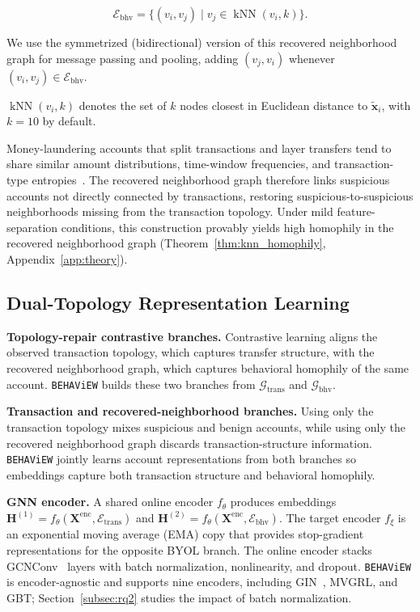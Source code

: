 \documentclass[sigconf,natbib=true,anonymous=true]{acmart}
\theoremstyle{definition}
\newcommand{\method}{\texttt{BEHAViEW}\xspace}
\begin{document}
\begin{equation}
\label{eq:knn_edge}
    \mathcal{E}_{\text{bhv}} = \{(v_i, v_j) \mid v_j \in \operatorname{kNN}(v_i, k)\}.
\end{equation}

We use the symmetrized (bidirectional) version of this recovered neighborhood graph for message passing and pooling, adding $(v_j, v_i)$ whenever $(v_i, v_j) \in \mathcal{E}_{\text{bhv}}$.

$\operatorname{kNN}(v_i, k)$ denotes the set of $k$ nodes closest in Euclidean distance to $\tilde{\mathbf{x}}_i$, with $k=10$ by default.

Money-laundering accounts that split transactions and layer transfers tend to share similar amount distributions, time-window frequencies, and transaction-type entropies~\cite{fatf2018pml,li2020flowscope}. The recovered neighborhood graph therefore links suspicious accounts not directly connected by transactions, restoring suspicious-to-suspicious neighborhoods missing from the transaction topology. Under mild feature-separation conditions, this construction provably yields high homophily in the recovered neighborhood graph (Theorem~\ref{thm:knn_homophily}, Appendix~\ref{app:theory}).

\subsection{Dual-Topology Representation Learning}
\label{subsec:dual_view}
\textbf{Topology-repair contrastive branches.} Contrastive learning aligns the observed transaction topology, which captures transfer structure, with the recovered neighborhood graph, which captures behavioral homophily of the same account. \method builds these two branches from $\mathcal{G}_{\text{trans}}$ and $\mathcal{G}_{\text{bhv}}$.

\textbf{Transaction and recovered-neighborhood branches.} Using only the transaction topology mixes suspicious and benign accounts, while using only the recovered neighborhood graph discards transaction-structure information. \method jointly learns account representations from both branches so embeddings capture both transaction structure and behavioral homophily.

\textbf{GNN encoder.} A shared online encoder $f_\theta$ produces embeddings $\mathbf{H}^{(1)} = f_\theta(\mathbf{X}^{\text{enc}}, \mathcal{E}_{\text{trans}})$ and $\mathbf{H}^{(2)} = f_\theta(\mathbf{X}^{\text{enc}}, \mathcal{E}_{\text{bhv}})$. The target encoder $f_\xi$ is an exponential moving average (EMA) copy that provides stop-gradient representations for the opposite BYOL branch. The online encoder stacks GCNConv~\cite{kipf2016semi} layers with batch normalization, nonlinearity, and dropout. \method is encoder-agnostic and supports nine encoders, including GIN~\cite{xu2018powerful}, MVGRL, and GBT; Section~\ref{subsec:rq2} studies the impact of batch normalization.
\end{document}
